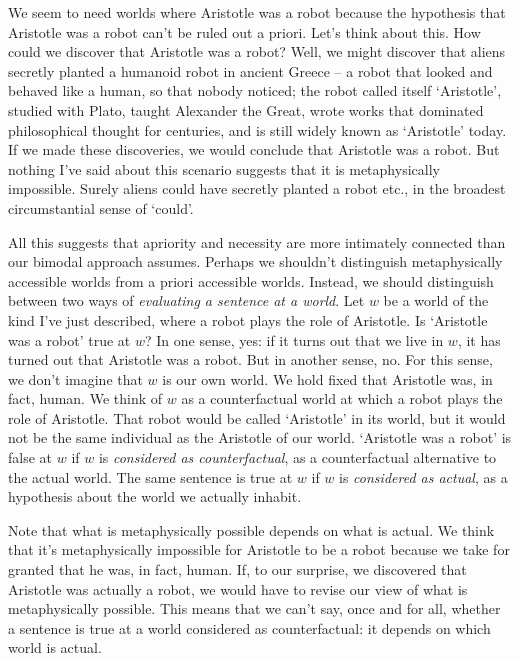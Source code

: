 We seem to need worlds where Aristotle was a robot because
the hypothesis that Aristotle was a robot can't be ruled out a priori.
Let's think about this.
How could we discover that Aristotle was a robot?
Well,
we might discover that
aliens secretly planted a humanoid robot in ancient Greece
-- a robot that looked and behaved like a human,
so that nobody noticed;
the robot called itself `Aristotle',
studied with Plato,
taught Alexander the Great,
wrote works that dominated philosophical thought for centuries,
and is still widely known as `Aristotle' today.
If we made these discoveries,
we would conclude that Aristotle was a robot.
But nothing I've said about this scenario suggests that it is metaphysically impossible.
Surely aliens could have secretly planted a robot etc.,
in the broadest circumstantial sense of `could'.

All this suggests that apriority and necessity are more intimately connected than
our bimodal approach assumes.
Perhaps we shouldn't distinguish metaphysically accessible worlds from a priori accessible worlds.
Instead,
we should distinguish between two ways of \emph{evaluating a sentence at a world}.
Let $w$ be a world of the kind I've just described,
where a robot plays the role of Aristotle.
Is `Aristotle was a robot' true at $w$?
In one sense, yes:
if it turns out that we live in $w$,
it has turned out that Aristotle was a robot.
But in another sense, no.
For this sense,
we don't imagine that $w$ is our own world.
We hold fixed that Aristotle was, in fact, human.
We think of $w$ as a counterfactual world at which a robot plays the role of Aristotle.
That robot would be called `Aristotle' in its world,
but it would not be the same individual as the Aristotle of our world.
`Aristotle was a robot' is false at $w$ if $w$ is \emph{considered as counterfactual},
as a counterfactual alternative to the actual world.
The same sentence is true at $w$ if $w$ is \emph{considered as actual},
as a hypothesis about the world we actually inhabit.

Note that what is metaphysically possible depends on what is actual.
We think that it's metaphysically impossible for Aristotle to be a robot because we
take for granted that he was, in fact, human.
If, to our surprise, we discovered that Aristotle was actually a robot,
we would have to revise our view of what is metaphysically possible.
This means that we can't say,
once and for all,
whether a sentence is true at a world considered as counterfactual:
it depends on which world is actual.

